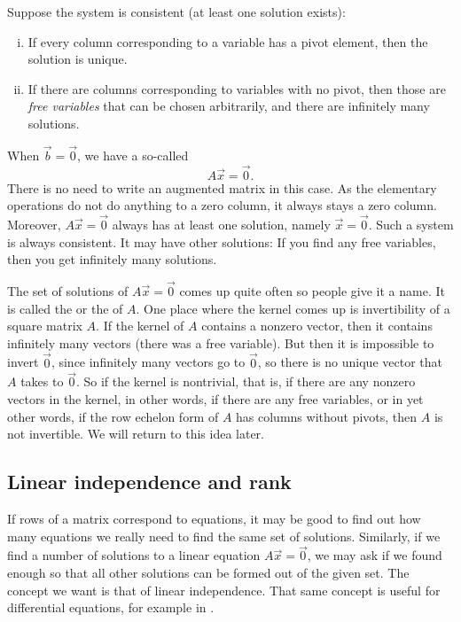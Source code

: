 Suppose the system is consistent (at least one solution exists):
\begin{enumerate}[(i)]
\item If every column corresponding to a variable has a pivot element,
then the solution is unique.
\item If there are columns corresponding to variables with no pivot,
then those are \emph{free variables} that can be chosen
arbitrarily, and there are infinitely many solutions.
\end{enumerate}

\medskip

When $\vec{b} = \vec{0}$, we have a so-called
\emph{}
\begin{equation*}
A \vec{x} = \vec{0} .
\end{equation*}
There is no need to write an augmented matrix in this
case.  As the elementary operations do not do anything to a zero column, it
always stays a zero column.  Moreover, $A \vec{x} = \vec{0}$ always has at
least one solution, namely $\vec{x} = \vec{0}$.  Such a system
is always consistent.  It may have other solutions:  If you find
any free variables, then you get infinitely many solutions.

The set of solutions of $A \vec{x} = \vec{0}$ comes up quite often
so people give it a name.  It is called the
\emph{} or the 
\emph{} of $A$.
One place where the kernel comes up is invertibility of a square matrix $A$.
If the kernel of $A$ contains a nonzero vector, then it contains
infinitely many vectors (there was a free variable).  But then it is
impossible to invert $\vec{0}$, since infinitely many vectors go to
$\vec{0}$, so there is no unique vector that $A$ takes to $\vec{0}$.
So if the kernel is nontrivial, that is, if there are any nonzero vectors in
the kernel,
in other words, if there are any free variables, or in yet other words,
if the row echelon form of $A$ has columns without pivots,
then $A$ is not invertible.  We will return to this idea later.

\subsection{Linear independence and rank}

If rows of a matrix correspond to equations, it may be good to find out
how many equations we really need to find the same set of solutions.
Similarly, if we find a number of solutions to a linear equation
$A \vec{x} = \vec{0}$, we may ask if we found enough 
so that all other solutions can be formed out of the given set.
The concept we want is that of linear independence.
That same concept is useful for differential equations, for
example in .

